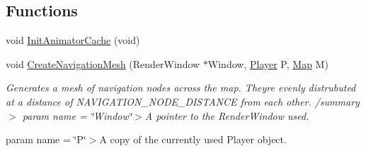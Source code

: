 \subsection*{Functions}
\begin{DoxyCompactItemize}
\item 
void \hyperlink{namespace_engine_1_1_core_a0a9fabc0b4dac04e7f2871a2ce13d795}{Init\+Animator\+Cache} (void)
\item 
void \hyperlink{namespace_engine_1_1_core_aed5870f781469ec1fcbb7b7114de91ff}{Create\+Navigation\+Mesh} (Render\+Window $\ast$Window, \hyperlink{class_engine_1_1_game_play_1_1_player}{Player} P, \hyperlink{class_engine_1_1_core_1_1_map}{Map} M)
\begin{DoxyCompactList}\small\item\em Generates a mesh of navigation nodes across the map. They\textquotesingle{}re evenly distrubuted at a distance of N\+A\+V\+I\+G\+A\+T\+I\+O\+N\+\_\+\+N\+O\+D\+E\+\_\+\+D\+I\+S\+T\+A\+N\+CE from each other. /summary$>$ param name = \char`\"{}\+Window\char`\"{}$>$A pointer to the Render\+Window used.

param name = \char`\"{}\+P\char`\"{}$>$A copy of the currently used Player object.


\end{DoxyCompactList}
\end{DoxyCompactItemize}
